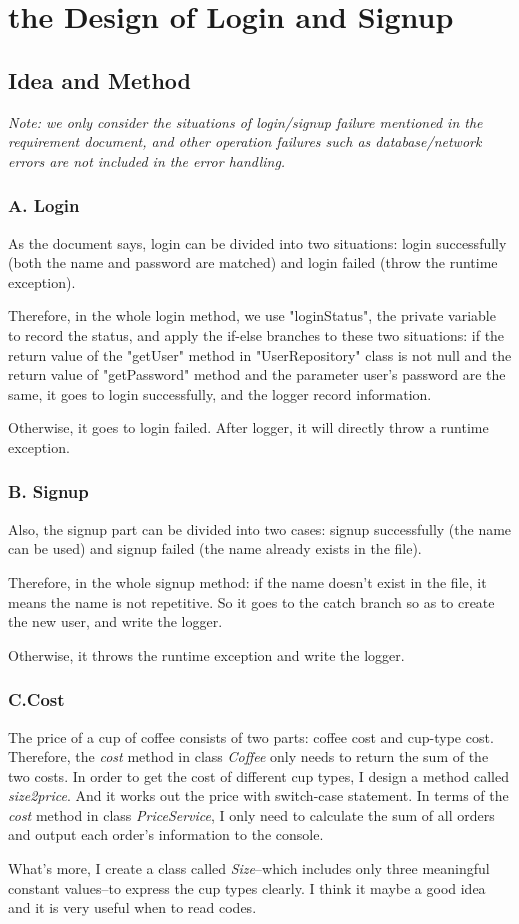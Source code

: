 \documentclass[./report.tex]{subfiles}
\begin{document}
\section{the Design of Login and Signup}
 \subsection{Idea and Method}
 \emph {Note: we only consider the situations of login/signup failure mentioned in the requirement document, and other operation failures such as database/network errors are not included in the error handling.}
 \subsubsection{A. Login}
\par As the document says, login can be divided into two situations: login successfully (both the name and password are matched) and login failed (throw the runtime exception).
\par Therefore, in the whole login method, we use "loginStatus", the private variable to record the status, and apply the if-else branches to these two situations: if the return value of the "getUser" method
in "UserRepository" class is not null and the return value of "getPassword" method and the parameter user's password are the same, it goes to login successfully, and the logger record information.
\par Otherwise, it goes to login failed. After logger, it will directly throw a runtime exception.
 \subsubsection{B. Signup}
\par Also, the signup part can be divided into two cases: signup successfully (the name can be used) and signup failed (the name already exists in the file).
\par Therefore, in the whole signup method: if the name doesn't exist in the file, it means the name is not repetitive. So it goes to the catch branch so as to create the new user, and write the logger.
\par Otherwise, it throws the runtime exception and write the logger.
\subsubsection{C.Cost}
\par The price of a cup of coffee consists of two parts: coffee cost and cup-type cost. Therefore, the \emph{cost} method in class \emph{Coffee} only needs to return the sum of the two costs. In order to get the cost of different cup types, I design a method called \emph{size2price}. And it works out the price with switch-case statement. In terms of the \emph{cost} method in class \emph{PriceService}, I only need to calculate the sum of all orders and output each order's information to the console.
\par What's more, I create a class called \emph{Size}--which includes only three meaningful constant values--to express the cup types clearly. I think it maybe a good idea and it is very useful when to read codes.
\end{document}
